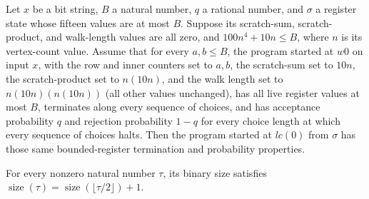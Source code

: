 \begin{lemma}
\label{Complexity.LogProg.ups_len}
\leanok
{}
Let $x$ be a bit string, $B$ a natural number, $q$ a rational number, and $\sigma$ a
register state whose fifteen values are at most $B$. Suppose its scratch-sum,
scratch-product, and walk-length values are all zero, and $100n^4+10n\le B$, where $n$
is its vertex-count value. Assume that for every $a,b\le B$, the program started at $w0$
on input $x$, with the row and inner counters set to $a,b$, the scratch-sum set to
$10n$, the scratch-product set to $n(10n)$, and the walk length set to $n(10n)(n(10n))$
(all other values unchanged), has all live register values at most $B$, terminates along
every sequence of choices, and has acceptance probability $q$ and rejection probability
$1-q$ for every choice length at which every sequence of choices halts. Then the program
started at $lc(0)$ from $\sigma$ has those same bounded-register termination and
probability properties.
\end{lemma}

\begin{lemma}
\label{Complexity.LogProg.size_eq_succ}
\leanok
{}
For every nonzero natural number $\tau$, its binary size satisfies
$\operatorname{size}(\tau)=\operatorname{size}(\lfloor\tau/2\rfloor)+1$.
\end{lemma}

